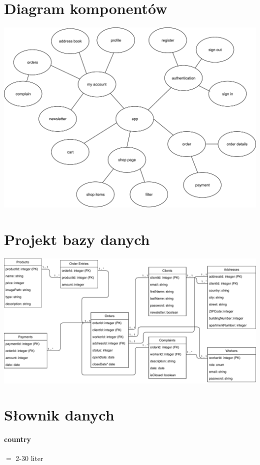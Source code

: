 \documentclass[10pt]{report}
\begin{document}
	\section{Diagram komponentów}
	\begin{center}
		\includegraphics[width=500pt]{components.pdf}
	\end{center}


	\section{Projekt bazy danych}
		\includegraphics[width=500pt]{database.pdf}
		 


\section{Słownik danych}

		\paragraph{country} $=$ 2-30 liter
\end{document}

